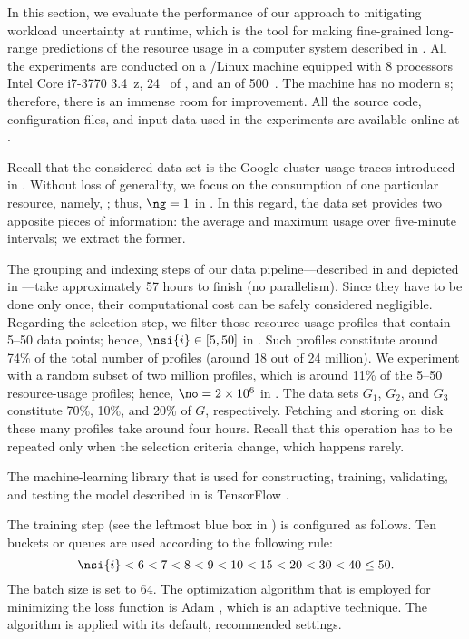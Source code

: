 In this section, we evaluate the performance of our approach to mitigating
workload uncertainty at runtime, which is the tool for making fine-grained
long-range predictions of the resource usage in a computer system described in
. All the experiments are conducted on a /Linux
machine equipped with 8 processors Intel Core i7-3770 3.4~z, 24~
of , and an  of 500~. The machine has no modern
s; therefore, there is an immense room for improvement. All the source
code, configuration files, and input data used in the experiments are available
online at \cite{eslab2017b}.


Recall that the considered data set is the Google cluster-usage traces
\cite{reiss2011} introduced in . Without loss of generality, we
focus on the consumption of one particular resource, namely, ; thus,
$\ng = 1$ in . In this regard, the data set provides two
apposite pieces of information: the average and maximum  usage over
five-minute intervals; we extract the former.

The grouping and indexing steps of our data pipeline---described in
 and depicted in ---take approximately 57
hours to finish (no parallelism). Since they have to be done only once, their
computational cost can be safely considered negligible. Regarding the selection
step, we filter those resource-usage profiles that contain 5--50 data points;
hence, $\nsi{i} \in [5, 50]$ in . Such profiles constitute
around 74\% of the total number of profiles (around 18 out of 24 million). We
experiment with a random subset of two million profiles, which is around 11\% of
the 5--50 resource-usage profiles; hence, $\no = 2 \times 10^6$ in
. The data sets $G_1$, $G_2$, and $G_3$ constitute 70\%,
10\%, and 20\% of $G$, respectively. Fetching and storing on disk these many
profiles take around four hours. Recall that this operation has to be repeated
only when the selection criteria change, which happens rarely.


The machine-learning library that is used for constructing, training,
validating, and testing the model described in  is TensorFlow
\cite{abadi2015}.

The training step (see the leftmost blue box in ) is
configured as follows. Ten buckets or queues are used according to the following
rule:
\[
  \nsi{i} < 6 < 7 < 8 < 9 < 10 < 15 < 20 < 30 < 40 \leq 50.
\]
The batch size \nb is set to 64. The optimization algorithm that is employed for
minimizing the loss function is Adam \cite{kingma2014}, which is an adaptive
technique. The algorithm is applied with its default, recommended settings.

